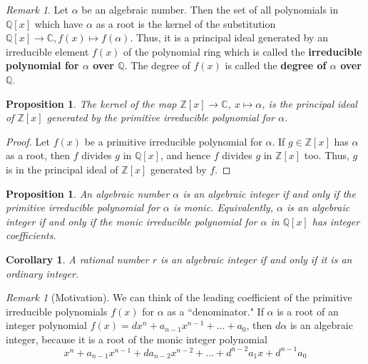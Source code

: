 \documentclass[12pt]{article}
\newtheorem{cor}[thm]{Corollary}
\newtheorem{prop}[thm]{Proposition}
\theoremstyle{definition}
\theoremstyle{remark}
\newtheorem{rmk}[thm]{Remark}
\numberwithin{equation}{section}
\newcommand\C{\mathbb C}    %
\newcommand\Z{\mathbb Z}    %
\newcommand\Q{\mathbb Q}    %
\newcommand\B[1]{\textbf{ #1}}
\begin{document}
\vspace{15pt}

\begin{rmk}
        Let $\alpha$ be an algebraic number. Then the set of all polynomials in $\Q[x]$ which have $\alpha$ as a root is the kernel of the substitution $\Q[x] \rightarrow \C, f(x) \mapsto f(\alpha)$. Thus, it is a principal ideal generated by an irreducible element $f(x)$ of the polynomial ring which is called the \B{irreducible polynomial for $\alpha$ over $\Q$}. The degree of $f(x)$ is called the \B{degree of $\alpha$ over $\Q$}.
\end{rmk}

\vspace{15pt}

\begin{prop}
        The kernel of the map $\Z[x] \rightarrow \C$, $x \mapsto \alpha$, is the principal ideal of $\Z[x]$ generated by the primitive irreducible polynomial for $\alpha$.
\end{prop}
\begin{proof}
        Let $f(x)$ be a primitive irreducible polynomial for $\alpha$. If $g \in \Z[x]$ has $\alpha$ as a root, then $f$ divides $g$ in $\Q[x]$, and hence $f$ divides $g$ in $\Z[x]$ too. Thus, $g$ is in the principal ideal of $\Z[x]$ generated by $f$.
\end{proof}

\vspace{15pt}

\begin{prop}
        An algebraic number $\alpha$ is an algebraic integer if and only if the primitive irreducible polynomial for $\alpha$ is monic. Equivalently, $\alpha$ is an algebraic integer if and only if the monic irreducible polynomial for $\alpha$ in $\Q[x]$ has integer coefficients.
\end{prop}

\vspace{15pt}

\begin{cor}
        A rational number $r$ is an algebraic integer if and only if it is an ordinary integer.
\end{cor}


\vspace{15pt}


\begin{rmk}[Motivation]
        We can think of the leading coefficient of the primitive irreducible polynomials $f(x)$ for $\alpha$ as a ``denominator." If $\alpha$ is a root of an integer polynomial $f(x) = dx^n+a_{n-1}x^{n-1}+...+a_0$, then $d\alpha$ is an algebraic integer, because it is a root of the monic integer polynomial \begin{equation}
                x^n + a_{n-1}x^{n-1} + da_{n-2}x^{n-2}+...+d^{n-2}a_1x+d^{n-1}a_0
        \end{equation}
\end{rmk}
\end{document}
